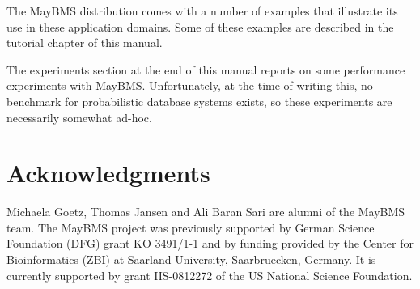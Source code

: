 \documentclass[12pt]{book}
\newcommand{\nop}[1]{}
\begin{document}
The MayBMS distribution comes with a number of examples that illustrate
its use in
these application domains. Some of these examples are described in the
tutorial chapter of this manual.

The experiments section at the end of
this manual reports on some performance experiments with MayBMS. Unfortunately,
at the time of writing this, no benchmark for probabilistic database
systems exists, so these experiments are necessarily somewhat ad-hoc.



\section{Acknowledgments}



Michaela Goetz, Thomas Jansen and Ali Baran Sari are alumni of the MayBMS team.
%
The MayBMS project was previously supported by
German Science Foundation (DFG) grant KO 3491/1-1 and by funding provided by
the Center for Bioinformatics (ZBI) at Saarland University, Saarbruecken,
Germany. It is currently supported by grant IIS-0812272 of the
US National Science Foundation.

















\nop{
\chapter{Planned Extensions}


Planned features for future releases of MayBMS are
\begin{itemize}
\item
The relaxation of some current minor restrictions in the query language.

\item
More efficient confidence computation.

\item
A knowledge compilation operation for conditioning a probabilistic database,
i.e., removing possible worlds that do not satisfy a given constraint.

\item
Continuous probability distributions.

\item
Support for importing graphical models such as Bayesian Networks.
\end{itemize}
} %


\newpage

\appendix







\end{document}
